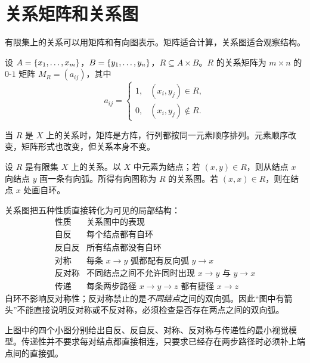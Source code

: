 \section{关系矩阵和关系图}

有限集上的关系可以用矩阵和有向图表示。矩阵适合计算，关系图适合观察结构。

\begin{definition}[关系矩阵]\label{ch2-relation-matrix}
设 $A=\{x_1,\ldots,x_m\}$，$B=\{y_1,\ldots,y_n\}$，$R\subseteq A\times B$。$R$ 的关系矩阵为 $m\times n$ 的 $0$-$1$ 矩阵 $M_R=(a_{ij})$，其中
\[
  a_{ij}=
  \begin{cases}
  1, & (x_i,y_j)\in R,\\
  0, & (x_i,y_j)\notin R.
  \end{cases}
\]
\end{definition}

当 $R$ 是 $X$ 上的关系时，矩阵是方阵，行列都按同一元素顺序排列。元素顺序改变，矩阵形式也改变，但关系本身不变。

\begin{definition}[关系图]\label{ch2-relation-digraph}
设 $R$ 是有限集 $X$ 上的关系。以 $X$ 中元素为结点；若 $(x,y)\in R$，则从结点 $x$ 向结点 $y$ 画一条有向弧。所得有向图称为 $R$ 的关系图。若 $(x,x)\in R$，则在结点 $x$ 处画自环。
\end{definition}


关系图把五种性质直接转化为可见的局部结构：
\[
\begin{array}{c|l}
\text{性质}&\text{关系图中的表现}\\ \hline
\text{自反}&\text{每个结点都有自环}\\
\text{反自反}&\text{所有结点都没有自环}\\
\text{对称}&\text{每条 }x\to y\text{ 弧都配有反向弧 }y\to x\\
\text{反对称}&\text{不同结点之间不允许同时出现 }x\to y\text{ 与 }y\to x\\
\text{传递}&\text{每条两步路径 }x\to y\to z\text{ 都有捷径 }x\to z
\end{array}
\]
自环不影响反对称性；反对称禁止的是\emph{不同结点}之间的双向弧。因此“图中有箭头”不能直接说明反对称或不反对称，必须检查是否存在两点之间的双向弧。


上图中的四个小图分别给出自反、反自反、对称、反对称与传递性的最小视觉模型。传递性并不要求每对结点都直接相连，只要求已经存在两步路径时必须补上端点间的直接弧。

